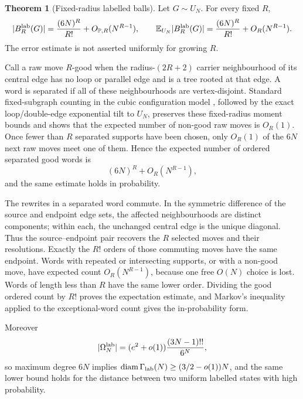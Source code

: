 \documentclass[11pt]{article}
\makeatletter
\newcommand{\E}{\mathbb E}
\newcommand{\diam}{\operatorname{diam}}
\theoremstyle{definition}
\newtheorem{theorem}{Theorem}
\renewenvironment{proof}[1][\proofname]{\par
  \pushQED{\qed}%
  \normalfont \topsep6\p@\@plus6\p@\relax
  \trivlist
  \item[\hskip\labelsep\bfseries #1\@addpunct{.}]\ignorespaces
}{%
  \popQED\endtrivlist\@endpefalse
}
\makeatother
\begin{document}
\begin{theorem}[Fixed-radius labelled balls]
Let $G\sim U_N$.  For every fixed $R$,
\[
 |B_R^{\rm lab}(G)|=\frac{(6N)^R}{R!}+O_{\mathbb P,R}(N^{R-1}),
 \qquad
 \E_{U_N}|B_R^{\rm lab}(G)|
 =\frac{(6N)^R}{R!}+O_R(N^{R-1}).
\]
The error estimate is not asserted uniformly for growing $R$.
\end{theorem}

\begin{proof}
Call a raw move $R$-good when the radius-$(2R+2)$ carrier neighbourhood of its
central edge has no loop or parallel edge and is a tree rooted at that edge.  A
word is separated if all of these neighbourhoods
are vertex-disjoint.  Standard fixed-subgraph counting in the cubic
configuration model \cite{janson-random-graphs}, followed by the exact
loop/double-edge exponential tilt
to $U_N$, preserves these fixed-radius moment bounds and shows that the
expected number of non-good raw moves is
$O_R(1)$.  Once fewer than $R$ separated supports have been chosen, only
$O_R(1)$ of the $6N$ next raw moves meet one of them.  Hence the expected number
of ordered separated good words is
\[
 (6N)^R+O_R(N^{R-1}),
\]
and the same estimate holds in probability.

The rewrites in a separated word commute.  In the symmetric difference of the
source and endpoint edge sets, the affected neighbourhoods are distinct
components; within each, the unchanged central edge is the unique diagonal.
Thus the source--endpoint pair recovers the $R$ selected moves and their
resolutions.  Exactly the $R!$ orders of those commuting moves have the same
endpoint.  Words with repeated or intersecting supports, or with a non-good
move, have expected count $O_R(N^{R-1})$, because one free $O(N)$ choice is
lost.  Words of length less than $R$ have the same lower order.  Dividing the
good ordered count by $R!$ proves the expectation estimate, and Markov's
inequality applied to the exceptional-word count gives the in-probability
form.
\end{proof}

Moreover
\[
 |\Omega_N^{\rm lab}|=(e^2+o(1))\frac{(3N-1)!!}{6^N},
\]
so maximum degree $6N$ implies
$\diam\Gamma_{\rm lab}(N)\ge(3/2-o(1))N$, and the same lower bound holds for
the distance between two uniform labelled states with high probability.
\end{document}
